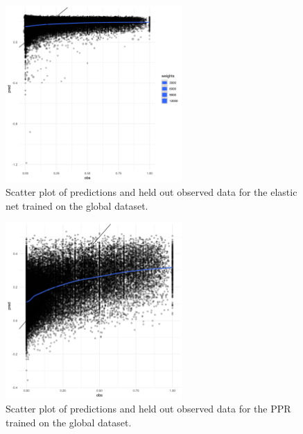 \documentclass[review]{elsarticle}
\begin{document}
\begin{figure}[h!]
  \centering
  \includegraphics[width=0.6\textwidth]{figs/SI/enet_obspred_global.png}
\caption{
  Scatter plot of predictions and held out observed data for the elastic net trained on the global dataset.
}

\end{figure}


\begin{figure}[h!]
  \centering
  \includegraphics[width=0.6\textwidth]{figs/SI/ppr_obspred_global.png}
\caption{
  Scatter plot of predictions and held out observed data for the PPR trained on the global dataset.
}

\end{figure}
\end{document}
